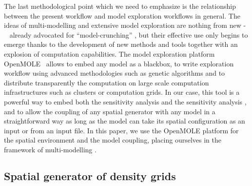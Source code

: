 \documentclass[preprint,5p,times,twocolumn,authoryear]{elsarticle}
\begin{document}
The last methodological point which we need to emphasize is the relationship between the present workflow and model exploration workflows in general. The ideas of multi-modelling and extensive model exploration are nothing from new - ~\cite{openshaw1983data} already advocated for ``model-crunching'' , but their effective use only begins to emerge thanks to the development of new methods and tools together with an explosion of computation capabilities. The model exploration platform OpenMOLE~\citep{reuillon2013openmole} allows to embed any model as a blackbox, to write  exploration workflow using advanced methodologies such as genetic algorithms and to distribute transparently the computation on large scale computation infrastructures such as clusters or computation grids. In our case, this tool is a powerful way to embed both the sensitivity analysis and the sensitivity analysis , and to allow the coupling of any spatial generator with any model in a straightforward way as long as the model can take its spatial configuration as an input or from an input file. In this paper, we use the OpenMOLE platform for the spatial environment and the model coupling, placing ourselves in the framework of multi-modelling \citep{cottineau2015modular}. 


\subsection{Spatial generator of density grids}
\end{document}
